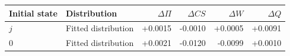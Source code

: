 \begin{tabular}{llrrrr}\toprule
Initial state & Distribution & $\Delta\Pi$ & $\Delta CS$ & $\Delta W$ & $\Delta Q$\\\midrule
$j$ & Fitted distribution & +0.0015 & -0.0010 & +0.0005 & +0.0091 \\
$0$ & Fitted distribution & +0.0021 & -0.0120 & -0.0099 & +0.0010 \\
\bottomrule\end{tabular}
